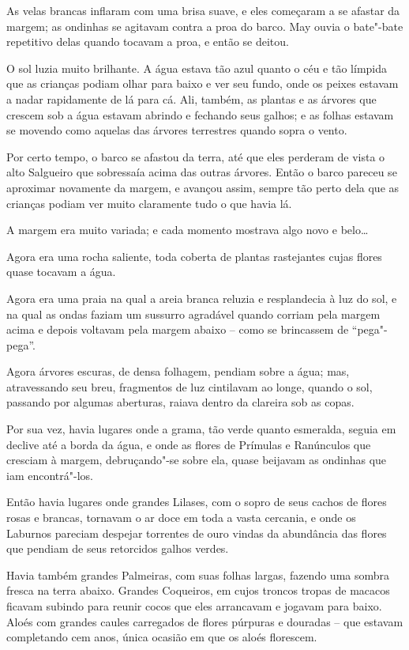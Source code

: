 As velas brancas inflaram com uma brisa suave, e eles começaram a se
afastar da margem; as ondinhas se agitavam contra a proa do barco. May
ouvia o bate"-bate repetitivo delas quando tocavam a proa, e então se
deitou.

O sol luzia muito brilhante. A água estava tão azul quanto o céu e tão
límpida que as crianças podiam olhar para baixo e ver seu fundo, onde os
peixes estavam a nadar rapidamente de lá para cá. Ali, também, as
plantas e as árvores que crescem sob a água estavam abrindo e fechando
seus galhos; e as folhas estavam se movendo como aquelas das árvores
terrestres quando sopra o vento.

Por certo tempo, o barco se afastou da terra, até que eles perderam de
vista o alto Salgueiro que sobressaía acima das outras árvores. Então o
barco pareceu se aproximar novamente da margem, e avançou assim, sempre
tão perto dela que as crianças podiam ver muito claramente tudo o que
havia lá.

A margem era muito variada; e cada momento mostrava algo novo e
belo…

Agora era uma rocha saliente, toda coberta de plantas rastejantes cujas
flores quase tocavam a água.

Agora era uma praia na qual a areia branca reluzia e resplandecia à luz
do sol, e na qual as ondas faziam um sussurro agradável quando corriam
pela margem acima e depois voltavam pela margem abaixo -- como se
brincassem de ``pega"-pega''.

Agora árvores escuras, de densa folhagem, pendiam sobre a água; mas,
atravessando seu breu, fragmentos de luz cintilavam ao longe, quando o
sol, passando por algumas aberturas, raiava dentro da clareira sob as
copas.

Por sua vez, havia lugares onde a grama, tão verde quanto esmeralda,
seguia em declive até a borda da água, e onde as flores de Prímulas e
Ranúnculos que cresciam à margem, debruçando"-se sobre ela, quase
beijavam as ondinhas que iam encontrá"-los.

Então havia lugares onde grandes Lilases, com o sopro de seus cachos de
flores rosas e brancas, tornavam o ar doce em toda a vasta cercania, e
onde os Laburnos pareciam despejar torrentes de ouro vindas da
abundância das flores que pendiam de seus retorcidos galhos verdes.

Havia também grandes Palmeiras, com suas folhas largas, fazendo uma
sombra fresca na terra abaixo. Grandes Coqueiros, em cujos troncos
tropas de macacos ficavam subindo para reunir cocos que eles arrancavam
e jogavam para baixo. Aloés com grandes caules carregados de flores
púrpuras e douradas -- que estavam completando cem anos, única ocasião
em que os aloés florescem.

